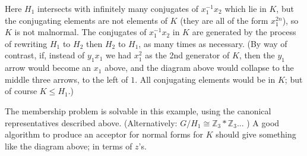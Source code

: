 \documentclass[a4paper,12pt]{article}
\numberwithin{equation}{section}
\numberwithin{figure}{section}
\newcommand{\ZZ}{\ensuremath{\mathbb{Z}}}
\begin{document}
Here $H_1$ intersects with infinitely many conjugates of $x_1^{-1}x_2$ which lie in $K$, but
the conjugating elements are not elements of $K$ (they are all of the form $x_1^{2n}$), so 
$K$ is not malnormal. The conjugates of  $x_1^{-1}x_2$ in $K$ are generated by the process of rewriting $H_1$ to $H_2$ then
$H_2$ to $H_1$, as many times as necessary.
(By way of contrast, if, instead of 
$y_1x_1$ we had $x_1^2$ as the 2nd generator of $K$, then the $y_1$ arrow would become an $x_1$ 
above, and the diagram above would collapse to the middle three arrows, to the left of $1$.
All conjugating elements would be in $K$; but of course $K\le H_1$.)

 

The membership problem is solvable in this example, using the canonical representatives described above. 
(Alternatively:  $G/H_1\cong \ZZ_3*\ZZ_3$... )  A good algorithm to produce
an acceptor for normal forms for $K$ should give something like the diagram above; in terms of $z$'s. 
\end{document}
